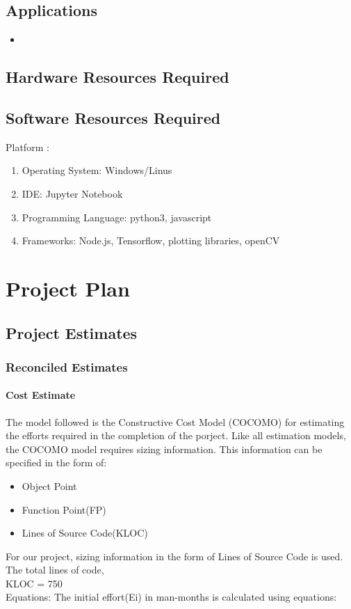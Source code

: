 \documentclass[oneside,a4paper,12pt]{report}
\begin{document}
\section{Applications}
\begin{itemize}
\item 
\end{itemize}

\section{Hardware Resources Required}
\begin{center}
	
\end{center}

\section{Software Resources Required}
Platform :
\begin{enumerate}
\item Operating System: Windows/Linus
\item IDE: Jupyter Notebook
\item Programming Language: python3, javascript
\item Frameworks: Node.js, Tensorflow, plotting libraries, openCV
\end{enumerate}




\chapter{Project Plan}

\section{Project Estimates}

\subsection{Reconciled Estimates}
\subsubsection{Cost Estimate}
\hspace*{0.25 in}
The model followed is the Constructive Cost Model (COCOMO) for estimating the
efforts required in the completion of the porject. Like all estimation models, the
COCOMO model requires sizing information. This information can be specified in
the form of:
\begin{itemize}
  \item Object Point
  \item Function Point(FP)
  \item Lines of Source Code(KLOC)
\end{itemize}
For our project, sizing information in the form of Lines of Source Code is used. The
total lines of code,\\
KLOC = 750\\
Equations: The initial effort(Ei) in man-months is calculated using equations:\\
\end{document}
